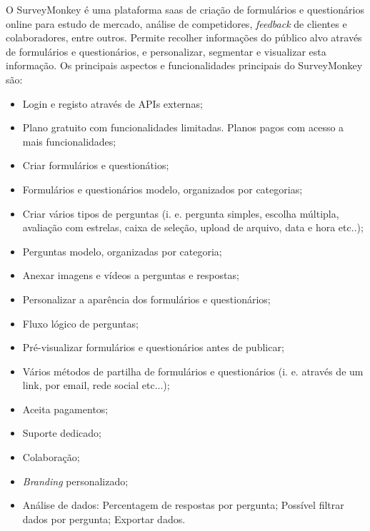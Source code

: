 O SurveyMonkey é uma plataforma \acrfull{saas} de criação de formulários e questionários online para estudo de mercado, análise de competidores, \textit{feedback} de clientes e colaboradores, entre outros. Permite recolher informações do público alvo através de formulários e questionários, e personalizar, segmentar e visualizar esta informação.
Os principais aspectos e funcionalidades principais do SurveyMonkey são:
\begin{itemize}
	\item Login e registo através de APIs externas;
	\item Plano gratuito com funcionalidades limitadas. Planos pagos com acesso a mais funcionalidades;
	\item Criar formulários e questionátios;
	\item Formulários e questionários modelo, organizados por categorias;
	\item Criar vários tipos de perguntas (i. e. pergunta simples, escolha múltipla, avaliação com estrelas, caixa de seleção, upload de arquivo, data e hora etc..);
	\item Perguntas modelo, organizadas por categoria;
	\item Anexar imagens e vídeos a perguntas e respostas;
	\item Personalizar a aparência dos formulários e questionários;
	\item Fluxo lógico de perguntas;
	\item Pré-visualizar formulários e questionários antes de publicar;
	\item Vários métodos de partilha de formulários e questionários (i. e. através de um link, por email, rede social etc...);
	\item Aceita pagamentos;
	\item Suporte dedicado;
	\item Colaboração;
	\item \textit{Branding} personalizado;
	\item Análise de dados:
		\subitem Percentagem de respostas por pergunta;
		\subitem Possível filtrar dados por pergunta;
		\subitem Exportar dados.
		
\end{itemize}

